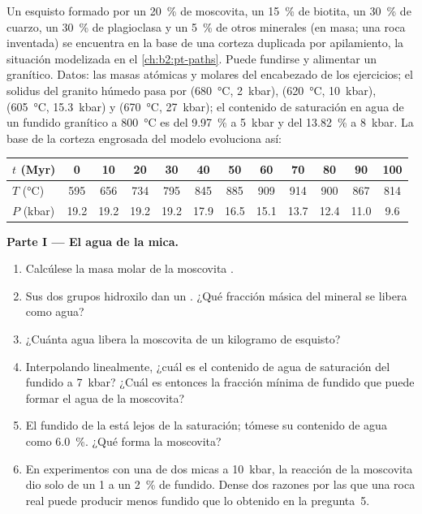 \begin{problem}\label{pb:b2:crustal-melting:1}
Un esquisto formado por un \qty{20}{\percent} de moscovita, un \qty{15}{\percent} de biotita, un
\qty{30}{\percent} de cuarzo, un \qty{30}{\percent} de plagioclasa y un \qty{5}{\percent} de otros
minerales (en masa; una roca inventada) se encuentra en la base de una corteza duplicada por apilamiento, la
situación modelizada en el \cref{ch:b2:pt-paths}. Puede fundirse y alimentar un  granítico. Datos:
las masas atómicas y molares del encabezado de los ejercicios; el solidus del granito húmedo pasa
por (\qty{680}{\celsius}, \qty{2}{kbar}), (\qty{620}{\celsius}, \qty{10}{kbar}),
(\qty{605}{\celsius}, \qty{15.3}{kbar}) y (\qty{670}{\celsius}, \qty{27}{kbar}); el
contenido de saturación en agua de un fundido granítico a \qty{800}{\celsius} es del \qty{9.97}{\percent} a
\qty{5}{kbar} y del \qty{13.82}{\percent} a \qty{8}{kbar}. La base de la corteza engrosada del modelo evoluciona así:

\smallskip
\begin{center}\small
\begin{tabular}{l|ccccccccccc}
$t$ (\unit{Myr}) & 0 & 10 & 20 & 30 & 40 & 50 & 60 & 70 & 80 & 90 & 100\\ \hline
$T$ (\unit{\celsius}) & 595 & 656 & 734 & 795 & 845 & 885 & 909 & 914 & 900 & 867 & 814\\
$P$ (\unit{kbar}) & 19.2 & 19.2 & 19.2 & 19.2 & 17.9 & 16.5 & 15.1 & 13.7 & 12.4 & 11.0 & 9.6
\end{tabular}
\end{center}
\smallskip

\noindent\textbf{Parte I --- El agua de la mica.}
\begin{enumerate}
\item Calcúlese la masa molar de la moscovita .
\item Sus dos grupos hidroxilo dan un . ¿Qué fracción másica del mineral se
libera como agua?
\item ¿Cuánta agua libera la moscovita de un kilogramo de esquisto?
\item Interpolando linealmente, ¿cuál es el contenido de agua de saturación del fundido a
\qty{7}{kbar}? ¿Cuál es entonces la fracción mínima de fundido que puede formar el agua de la moscovita?
\item El fundido de la  está lejos de la saturación; tómese su contenido de agua como
\qty{6.0}{\percent}. ¿Qué  forma la moscovita?
\item En experimentos con una  de dos micas a \qty{10}{kbar}, la reacción de la moscovita
dio solo de un 1 a un \qty{2}{\percent} de fundido. Dense dos razones por las que una roca real puede producir menos
fundido que lo obtenido en la pregunta~5.
\end{enumerate}


\end{problem}
